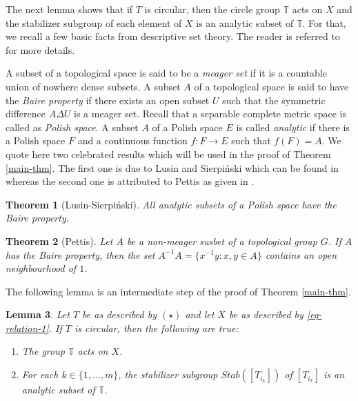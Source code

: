 \documentclass[a4paper,oneside,10pt, reqno]{amsproc}
\newtheorem{theorem}{Theorem}[section]
\newtheorem{lemma}[theorem]{Lemma}%
\theoremstyle{remark}
\theoremstyle{definition}
\begin{document}
The next lemma shows that if $T$ is circular, then the circle group $\mathbb T$ acts on $X$ and the stabilizer subgroup of each element of $X$ is an analytic subset of $\mathbb T$. For that, we recall a few basic facts from descriptive set theory. The reader is referred to \cite{K} for more details.

A subset of a topological space is said to be a {\it meager set} if it is a countable union of nowhere dense subsets. A  subset $A$ of a topological space is said to have the {\it Baire property} if there exists an open subset $U$ such that the symmetric difference $A \Delta U$ is a meager set. Recall that a separable complete metric space is called as {\it Polish space}. A subset $A$ of a Polish space $E$ is called {\it analytic} if there is a Polish space $F$ and a continuous function $f : F \to E$ such that $f(F) = A$. We quote here two celebrated results which will be used in the proof of Theorem \ref{main-thm}. The first one is due to Lusin and Sierpi\'nski which can be found in \cite[Theorem 21.6, Pg 153]{K} whereas the second one is attributed to Pettis as given in \cite[Theorem 9.9, Pg 61]{K}. 

\begin{theorem}[Lusin-Sierpi\'nski]\label{LST}
All analytic subsets of a Polish space have the Baire property.
\end{theorem}     

\begin{theorem}[Pettis]\label{PT}
Let $A$ be a non-meager susbet of a topological group $G$. If $A$ has the Baire property, then the set $A^{-1}A = \{x^{-1}y : x, y \in A\}$ contains an open neighbourhood of $1$.
\end{theorem}

The following lemma is an intermediate step of the proof of Theorem \ref{main-thm}.

\begin{lemma}\label{grp-action}
Let $T$ be as described by $(\star)$ and let $X$ be as described by \eqref{eq-relation-1}. If $T$ is circular, then the following are true:
\begin{enumerate}
\item[(i)] The group $\mathbb T$ acts on $X$.
\item[(ii)] For each $k \in  \{1, \ldots, m\}$, the stabilizer subgroup $Stab([T_{i_k}])$ of $[T_{i_k}]$ is an analytic subset of $\mathbb T$. 
\end{enumerate}  
\end{lemma}
\end{document}
